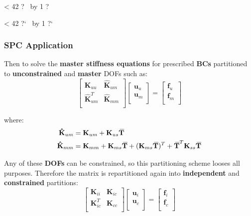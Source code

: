 \documentclass[10pt,b5paper,titlepage]{book}
\newcommand{\m}{\mathbf}
\newcommand{\closure}[2][3]{%
{}\mkern#1mu\overline{\mkern-#1mu#2}}
\newcommand{\repeatit}[3][10]{%
    \myloopcounter1%
    \loop\ifnum\myloopcounter < #1
    #2#3%
    \advance\myloopcounter by 1%
    \repeat%
    #2%
}
\newenvironment{qbox}
{
\begin{center}
    \repeatit[42]{?}{\ }
\end{center}
}
{
\begin{center}
    \repeatit[42]{?`}{\ }
\end{center}
}
\newenvironment{eqarray}
{
    \begin{eqnarray}
        \begin{aligned}
}
{
        \end{aligned}
    \end{eqnarray}
}
\begin{document}
\begin{qbox}
\begin{enumerate}
    \end{enumerate}

\end{qbox}



\subsubsection{SPC Application}

Then to solve the \textbf{master stiffness equations} for prescribed \textbf{BCs}
partitioned to \textbf{unconstrained} and \textbf{master} DOFs such as:
\begin{equation}
    \begin{bmatrix}
        \m{K}_{uu} & \m{\hat{K}}_{um} \\
        \m{\hat{K}}_{um}^T & \m{\hat{K}}_{mm} \\
    \end{bmatrix}
    \begin{bmatrix}
        \m{u}_u \\
        \m{u}_m \\
    \end{bmatrix}
    = \begin{bmatrix}
        \m{f}_{u} \\
        \m{f}_m \\
    \end{bmatrix}
\end{equation}

where:
\begin{eqarray}
    \m{\hat{K}}_{um} &= \m{K}_{um} + \m{K}_{us} \m{\closure{T}} \\
    \m{\hat{K}}_{mm} &= \m{K}_{mm} + \m{K}_{ms} \m{\closure{T}}
                      + (\m{K}_{ms} \m{\closure{T}})^T
                      + \m{\closure{T}}^T \m{K}_{ss} \m{\closure{T}}
\end{eqarray}

Any of these \textbf{DOFs} can be constrained, so this partitioning scheme looses
all purposes. Therefore the matrix is repartitioned again into
\textbf{independent} and \textbf{constrained} partitions:
\begin{equation}
    \begin{bmatrix}
        \m{K}_{ii} & \m{K}_{ic} \\
        \m{K}_{ic}^T & \m{K}_{cc} \\
    \end{bmatrix}
    \begin{bmatrix}
        \m{u}_i \\
        \m{u}_c \\
    \end{bmatrix}
    = \begin{bmatrix}
        \m{f}_{i} \\
        \m{f}_c \\
    \end{bmatrix}
\end{equation}
\end{document}
